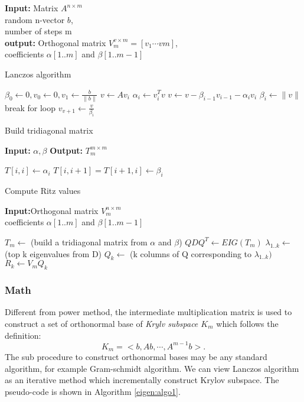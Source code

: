 \begin{algorithm}
{\bf Input:} Matrix $A^{n \times m}$\\
random n-vector $b$,\\
number of steps m\\
{\bf output:} Orthogonal matrix $ V^{v \times m}_{m} = [v_{1}\cdots v{m}]$,\\
coefficients $\alpha[1..m]$ and $\beta[1..m-1]$
\begin{algorithmic}[1]
\caption{Lanczos algorithm}
\STATE $\beta_{0} \leftarrow 0, v_{0} \leftarrow 0, v_{1} \leftarrow \frac{b}{\parallel b \parallel}$ 
	\STATE $v \leftarrow Av_{i}$
	\STATE $\alpha_{i} \leftarrow v^{T}_{i}v $
	\STATE $v \leftarrow v - \beta_{i-1}v_{i-1} - \alpha_{i}v_{i}$
	\STATE $\beta_{i} \leftarrow \parallel v\parallel $
	\STATE break for loop 
	\ENDIF
	\STATE $ v_{v+1} \leftarrow \frac{v}{\beta_{i}} $
\ENDFOR
\end{algorithmic}
\label{eigen:algo1}
\end{algorithm}

\begin{algorithm}
\caption{Build tridiagonal matrix}
{\bf Input:} $\alpha, \beta$
{\bf Output:} $T^{m\times m}_{m}$
\begin{algorithmic}[1]
	\STATE $T[i, i] \leftarrow \alpha_{i} $
	\STATE $T[i, i+1] = T[i+1, i] \leftarrow \beta_{i}$
\ENDFOR	
\end{algorithmic}
\label{eigen:algo2}
\end{algorithm}

\begin{algorithm}
\caption{Compute Ritz values}
{\bf Input:}Orthogonal matrix $V^{n\times m}_{m}$\\
coefficients $\alpha[1..m]$ and $\beta[1..m-1]$
\begin{algorithmic}[1]
\STATE $T_{m} \leftarrow$ (build a tridiagonal matrix from $\alpha$ and $\beta$)
\STATE $QDQ^{T} \leftarrow EIG(T_{m})$
\STATE $\lambda_{1..k} \leftarrow$ (top k eigenvalues from D)
\STATE $Q_{k} \leftarrow $ (k columns of Q corresponding to $\lambda_{1..k})$
\STATE $R_{k} \leftarrow V_{m}Q_{k}$
\end{algorithmic}
\label{eigen:algo3}
\end{algorithm}

\subsubsection{Math}
Different from power method, the intermediate multiplication matrix is used to construct a set of orthonormal base of \emph{Krylv subspace $K_{m}$} which follows the definition:
\begin{equation}
K_{m} = < b, Ab, \cdots, A^{m-1}b>.
\end{equation}
The sub procedure to construct orthonormal bases may be any standard algorithm, for example Gram-schmidt algorithm. We can view Lanczos algorithm as an iterative method which incrementally construct Krylov subspace. The pseudo-code is shown in Algorithm \ref{eigen:algo1}.

